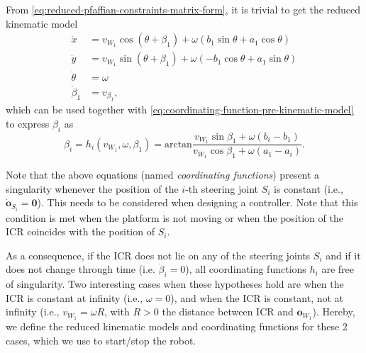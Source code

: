 From \eqref{eq:reduced-pfaffian-constraints-matrix-form}, it is trivial to
get the reduced kinematic model
\begin{equation}
\label{eq:reduced-kinematic-model}
\begin{split}
    \dot{x} &= v_{W_1} \cos(\theta + \beta_1) + \omega (b_1 \sin\theta + a_1 \cos\theta) \\
    \dot{y} &= v_{W_1} \sin(\theta + \beta_1) + \omega (-b_1 \cos\theta + a_1 \sin\theta) \\
    \dot{\theta} &= \omega \\
    \dot{\beta}_1 &= v_{\beta_1},
\end{split}
\end{equation}
which can be used together with \eqref{eq:coordinating-function-pre-kinematic-model}
to express $\beta_i$ as
\begin{equation}
    \label{eq:coordinating-function-post-kinematic-model}
    \beta_i = h_i(v_{W_1}, \omega, \beta_1) = \mathrm{arctan} \frac{v_{W_1}\sin\beta_1+\omega(b_i-b_1)}{v_{W_1}\cos\beta_1+\omega(a_1-a_i)}.
\end{equation}

Note that the above equations (named \textit{coordinating functions}) present a singularity whenever the position of the $i$-th steering joint $S_i$ is constant (i.e., $\dot{\bm{o}}_{S_i}=\bm{0}$). This needs to be considered when designing a controller. Note that this condition is met when the platform is not moving or when the position of the ICR coincides with the position of $S_i$. 

As a consequence, if the ICR does not lie on any of the steering joints $S_i$
and if it does not change through time (i.e. $\dot{\beta}_i = 0$), all
coordinating functions $h_i$ are free of singularity. Two interesting cases when
these hypotheses hold are when the ICR is constant at infinity
(i.e., $\omega = 0$), and when the ICR is constant, not at infinity
(i.e., $v_{W_1} = \omega R$, with $R > 0$ the distance between ICR and
$\bm{o}_{W_1}$). Hereby, we define the reduced kinematic models and coordinating
functions for these 2 cases, which we use to start/stop the robot.

